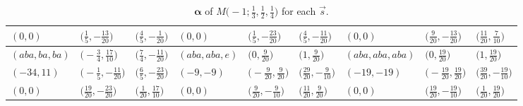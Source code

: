 \documentclass[10pt,a4paper]{amsart}
\def\bal{\boldsymbol{\alpha}}
\theoremstyle{definition}
\numberwithin{equation}{section}
\begin{document}
\begin{landscape}
\begin{table}[th]
\begin{tabular}{|lll|lll|lll|}
\\
$(0, 0)$ & $\bigl(\frac{1}{5}, -\frac{13}{20}\bigr)$ & $\bigl(\frac{4}{5}, -\frac{1}{20}\bigr)$ & $(0, 0)$ & $\bigl(\frac{1}{5}, -\frac{23}{20}\bigr)$ & $\bigl(\frac{4}{5}, -\frac{11}{20}\bigr)$ & $(0, 0)$ & $\bigl(\frac{9}{20}, -\frac{13}{20}\bigr)$ & $\bigl(\frac{11}{20}, \frac{7}{10}\bigr)$
\\\hline
$(aba, ba, ba)$ & $\bigl(-\frac{3}{4}, \frac{17}{10}\bigr)$ & $\bigl(\frac{7}{4}, -\frac{11}{20}\bigr)$ & $(aba, aba, e)$ & $\bigl(0, \frac{9}{20}\bigr)$ & $\bigl(1, \frac{9}{20}\bigr)$ & $(aba, aba, aba)$ & $\bigl(0, \frac{19}{20}\bigr)$ & $\bigl(1, \frac{19}{20}\bigr)$
\\
$(-34, 11)$ & $\bigl(-\frac{1}{5}, -\frac{11}{20}\bigr)$ & $\bigl(\frac{6}{5}, -\frac{23}{20}\bigr)$ & $(-9, -9)$ & $\bigl(-\frac{9}{20}, \frac{9}{20}\bigr)$ & $\bigl(\frac{29}{20}, -\frac{9}{10}\bigr)$ & $(-19, -19)$ & $\bigl(-\frac{19}{20}, \frac{19}{20}\bigr)$ & $\bigl(\frac{39}{20}, -\frac{19}{10}\bigr)$
\\
$(0, 0)$ & $\bigl(\frac{19}{20}, -\frac{23}{20}\bigr)$ & $\bigl(\frac{1}{20}, \frac{17}{10}\bigr)$ & $(0, 0)$ & $\bigl(\frac{9}{20}, -\frac{9}{10}\bigr)$ & $\bigl(\frac{11}{20}, \frac{9}{20}\bigr)$ & $(0, 0)$ & $\bigl(\frac{19}{20}, -\frac{19}{10}\bigr)$ & $\bigl(\frac{1}{20}, \frac{19}{20}\bigr)$ \\ \hline
\end{tabular}
 \caption{$\bal$ of $M\bigl( -1;\frac{1}{3},\frac{1}{2}, \frac{1}{4} \bigr)$ for each $\vec s$.} \label{tab:balinrangePseudo}
\end{table}


\end{landscape}
\end{document}
